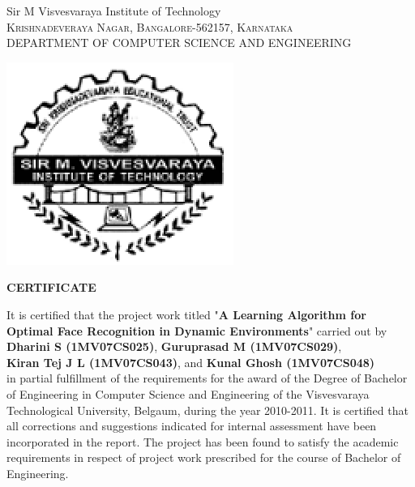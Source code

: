 \documentclass[10pt,a4paper]{article}
\begin{document}
\thispagestyle{empty}

\begin{center}
\LARGE{Sir M Visvesvaraya Institute of Technology}\\
\vspace{1mm}
\normalsize\textsc{Krishnadeveraya Nagar, Bangalore-562157, Karnataka\\ }
\vspace{3mm}
\normalsize{DEPARTMENT OF COMPUTER SCIENCE  AND  ENGINEERING}

\vspace{3mm}
\includegraphics[scale=0.80]{spicture1.eps}

\vspace{3mm}

\textup{\Large \textbf{CERTIFICATE}} 							
\vspace{3mm}
\end{center} 								

It is certified that the project work titled "\textbf{A Learning Algorithm for \\
Optimal Face Recognition in Dynamic Environments}" carried out by \\
\textbf{Dharini S (1MV07CS025)}, \textbf{Guruprasad M (1MV07CS029)}, \\ \textbf{Kiran Tej J L (1MV07CS043)}, and \textbf{Kunal Ghosh (1MV07CS048)} \\
in partial fulfillment of the requirements for the award of the Degree of Bachelor of Engineering in Computer Science and Engineering of the Visvesvaraya Technological University, Belgaum, during the year 2010-2011. It is certified that all corrections and suggestions indicated for internal assessment have been incorporated in the report. The project has been found to satisfy the academic requirements in respect of project work prescribed for the course of Bachelor of Engineering. \\ \\
\end{document}
